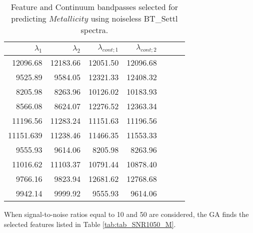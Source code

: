 %
% 
\begin{table}
\begin{center}
\begin{tabular}{rrrrrrr}
  \hline
  $\lambda_1$ & $\lambda_2$ & $\lambda_{cont;1}$ & $\lambda_{cont;2} $ \\ 
  \hline
     12096.68 & 12183.66  & 12051.50 & 12096.68 \\
     9525.89 & 9584.05 	  & 12321.33 & 12408.32 \\
     8205.98 & 8263.96 	  & 10126.02 & 10183.93 \\
     8566.08 & 8624.07 	  & 12276.52 & 12363.34 \\
     11196.56 & 11283.24  & 11151.63 & 11196.56 \\
     11151.639 & 11238.46 & 11466.35 & 11553.33 \\
     9555.93 & 9614.06 	  & 8205.98  & 8263.96 \\
     11016.62 & 11103.37  & 10791.44 & 10878.40 \\
     9766.16 & 9823.94 	  & 12681.62 & 12768.68 \\
     9942.14 & 9999.92   & 9555.93  & 9614.06 \\
\hline
\end{tabular}
\caption {Feature and Continuum bandpasses selected for predicting $Metallicity$ 
      using noiseless BT\_Settl spectra.} \label{tab:tab_SNRoo_M}
\end{center}
\end{table}

When signal-to-noise ratios equal to 10 and 50 are considered, the
GA finds the selected features listed in Table \ref{tab:tab_SNR1050_M}.


